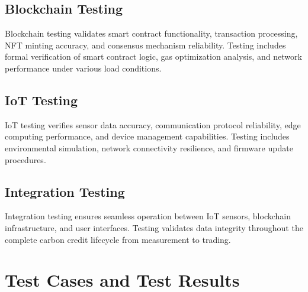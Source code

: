 \documentclass[oneside,a4paper,12pt]{book}
\begin{document}
\subsection{Blockchain Testing}
Blockchain testing validates smart contract functionality, transaction processing, NFT minting accuracy, and consensus mechanism reliability. Testing includes formal verification of smart contract logic, gas optimization analysis, and network performance under various load conditions.

\subsection{IoT Testing}
IoT testing verifies sensor data accuracy, communication protocol reliability, edge computing performance, and device management capabilities. Testing includes environmental simulation, network connectivity resilience, and firmware update procedures.

\subsection{Integration Testing}
Integration testing ensures seamless operation between IoT sensors, blockchain infrastructure, and user interfaces. Testing validates data integrity throughout the complete carbon credit lifecycle from measurement to trading.

\section{Test Cases and Test Results}
\end{document}
